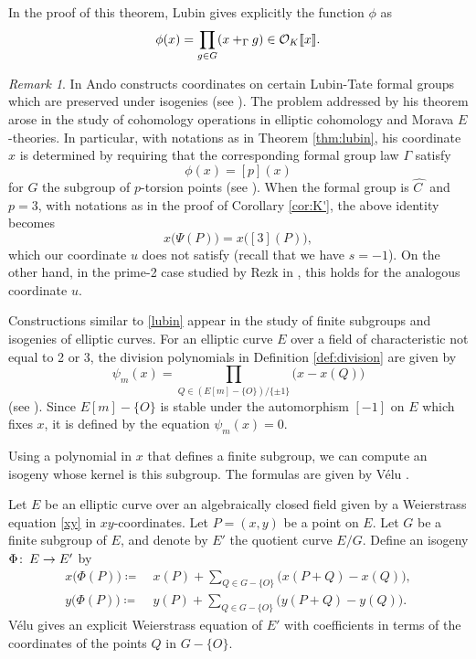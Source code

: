 \documentclass{gtpart}
\theoremstyle{definition}
\theoremstyle{remark}
\newtheorem{rmk}[thm]{Remark}
\def\co{\colon\thinspace}
\newcommand{\CO}{{\cal O}}
\newcommand{\HC}{\widehat{C~}\!}
\newcommand{\G}{\Gamma}
\newcommand{\ce}{\coloneqq}
\numberwithin{equation}{section}
\numberwithin{thm}{section}
\begin{document}
In the proof of this theorem, Lubin gives explicitly the function $\phi$ 
as 
\begin{equation}
\label{lubin}
 \phi(x) = \prod_{g \in G} (x +_\G g) \in \CO_K \llbracket x \rrbracket.  
\end{equation}

\begin{rmk}
 In \cite{Ando95} Ando constructs coordinates on certain Lubin-Tate 
 formal groups which are preserved under isogenies (see 
 \cite[Theorem 2.5.7]{Ando95}).  The problem addressed by his theorem 
 arose in the study of cohomology operations in elliptic cohomology and 
 Morava $E$-theories.  In particular, with notations as in Theorem 
 \ref{thm:lubin}, his coordinate $x$ is determined by requiring that the 
 corresponding formal group law $\G$ satisfy 
 \[
  \phi(x) = [p](x) 
 \]
 for $G$ the subgroup of $p$-torsion points (see 
 \cite[Theorem 2.6.4]{Ando95}).  When the formal group is $\HC$ and 
 $p=3$, with notations as in the proof of Corollary \ref{cor:K'}, the 
 above identity becomes 
 \[
  x\big( \Psi(P) \big) = x\big( [3](P) \big), 
 \]
 which our coordinate $u$ does not satisfy (recall that we have 
 $s = -1$).  On the other hand, in the prime-2 case studied by Rezk in 
 \cite{h2p2}, this holds for the analogous coordinate $u$.  
\end{rmk}

Constructions similar to \eqref{lubin} appear in the study of finite 
subgroups and isogenies of elliptic curves.  For an elliptic curve $E$ 
over a field of characteristic not equal to 2 or 3, the division 
polynomials in Definition \ref{def:division} are given by 
\begin{equation}
\label{division}
 \psi_m(x) = \prod_{Q \in (E[m]-\{O\}) / \{\pm1\}} \big( x - x(Q) \big) 
\end{equation}
(see \cite[13(9.2)]{husemoller}).  Since $E[m]-\{O\}$ is stable under 
the automorphism $[-1]$ on $E$ which fixes $x$, it is defined by the 
equation $\psi_m(x) = 0$.  

Using a polynomial in $x$ that defines a finite subgroup, we can compute 
an isogeny whose kernel is this subgroup.  The formulas are given by 
V\'elu \cite{velu}.  

Let $E$ be an elliptic curve over an algebraically closed field given by 
a Weierstrass equation \eqref{xy} in $xy$-coordinates.  Let $P = (x,y)$ 
be a point on $E$.  Let $G$ be a finite subgroup of $E$, and denote by 
$E'$ the quotient curve $E/G$.  Define an isogeny $\Phi \co E \to E'$ by 
\begin{equation}
\label{velu}
\begin{split}
 x \big( \Phi(P) \big) \ce & ~ x(P) + \sum_{Q \in G-\{O\}} \big( x(P+Q) - x(Q) \big), \\
 y \big( \Phi(P) \big) \ce & ~ y(P) + \sum_{Q \in G-\{O\}} \big( y(P+Q) - y(Q) \big).  
\end{split}
\end{equation}
V\'elu gives an explicit Weierstrass equation of $E'$ with coefficients 
in terms of the coordinates of the points $Q$ in $G-\{O\}$.  
\end{document}

